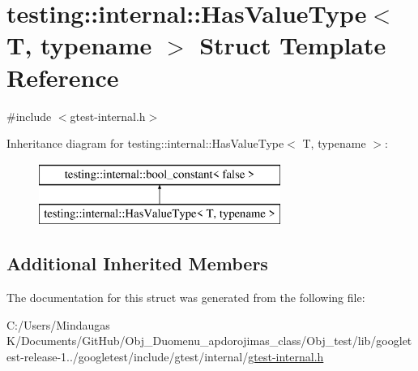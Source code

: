 \hypertarget{structtesting_1_1internal_1_1_has_value_type}{}\section{testing\+::internal\+::Has\+Value\+Type$<$ T, typename $>$ Struct Template Reference}
\label{structtesting_1_1internal_1_1_has_value_type}


{\ttfamily \#include $<$gtest-\/internal.\+h$>$}

Inheritance diagram for testing\+::internal\+::Has\+Value\+Type$<$ T, typename $>$\+:\begin{figure}[H]
\begin{center}
\leavevmode
\includegraphics[height=2.000000cm]{dd/de2/structtesting_1_1internal_1_1_has_value_type}
\end{center}
\end{figure}
\subsection*{Additional Inherited Members}


The documentation for this struct was generated from the following file\+:\begin{DoxyCompactItemize}
\item 
C\+:/\+Users/\+Mindaugas K/\+Documents/\+Git\+Hub/\+Obj\+\_\+\+Duomenu\+\_\+apdorojimas\+\_\+class/\+Obj\+\_\+test/lib/googletest-\/release-\/1../googletest/include/gtest/internal/\mbox{\hyperlink{_obj__test_2lib_2googletest-release-1_88_81_2googletest_2include_2gtest_2internal_2gtest-internal_8h}{gtest-\/internal.\+h}}\end{DoxyCompactItemize}
